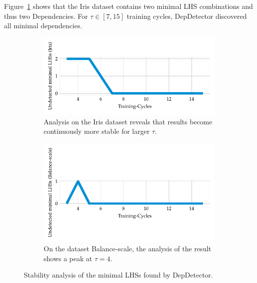 Figure~\ref{fig:dep_detector_lhs_stability_iris} shows that the Iris dataset contains two minimal LHS combinations and thus two Dependencies.
For \( \tau \in [7, 15] \) training cycles, DepDetector discovered all minimal dependencies.
\begin{figure}[ht]
     \centering
     \begin{subfigure}[b]{0.45\textwidth}
         \centering
         \includegraphics[width=\textwidth]{../figures/iris/dep_detector_lhs_stability}
         \caption{Analysis on the Iris dataset reveals that results become continuously more stable for larger \( \tau \).}
         \label{fig:dep_detector_lhs_stability_iris}
     \end{subfigure}
     \hfill
     \begin{subfigure}[b]{0.45\textwidth}
         \centering
         \includegraphics[width=\textwidth]{../figures/balance-scale/dep_detector_lhs_stability.pdf}
         \caption{On the dataset Balance-scale, the analysis of the result shows a peak at \( \tau = 4 \).}
         \label{fig:dep_detector_lhs_stability_balance_scale}
     \end{subfigure}
        \caption{Stability analysis of the minimal LHSs found by DepDetector.}
        \label{fig:stabilit_analysis}
\end{figure}

